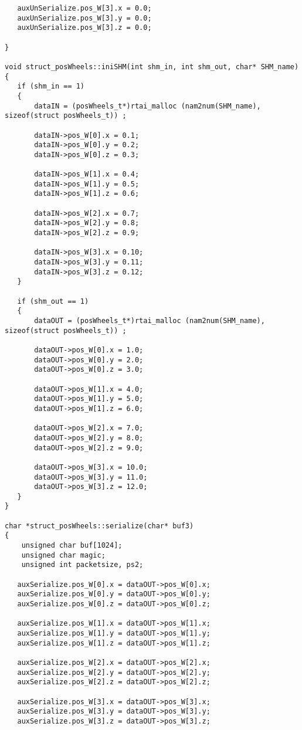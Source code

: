 \begin{verbatim}
   auxUnSerialize.pos_W[3].x = 0.0;
   auxUnSerialize.pos_W[3].y = 0.0;
   auxUnSerialize.pos_W[3].z = 0.0;

}

void struct_posWheels::iniSHM(int shm_in, int shm_out, char* SHM_name)
{
   if (shm_in == 1)
   {
       dataIN = (posWheels_t*)rtai_malloc (nam2num(SHM_name), sizeof(struct posWheels_t)) ;

       dataIN->pos_W[0].x = 0.1;
       dataIN->pos_W[0].y = 0.2;
       dataIN->pos_W[0].z = 0.3;

       dataIN->pos_W[1].x = 0.4;
       dataIN->pos_W[1].y = 0.5;
       dataIN->pos_W[1].z = 0.6;

       dataIN->pos_W[2].x = 0.7;
       dataIN->pos_W[2].y = 0.8;
       dataIN->pos_W[2].z = 0.9;

       dataIN->pos_W[3].x = 0.10;
       dataIN->pos_W[3].y = 0.11;
       dataIN->pos_W[3].z = 0.12;
   }

   if (shm_out == 1)
   {
       dataOUT = (posWheels_t*)rtai_malloc (nam2num(SHM_name), sizeof(struct posWheels_t)) ;

       dataOUT->pos_W[0].x = 1.0;
       dataOUT->pos_W[0].y = 2.0;
       dataOUT->pos_W[0].z = 3.0;

       dataOUT->pos_W[1].x = 4.0;
       dataOUT->pos_W[1].y = 5.0;
       dataOUT->pos_W[1].z = 6.0;

       dataOUT->pos_W[2].x = 7.0;
       dataOUT->pos_W[2].y = 8.0;
       dataOUT->pos_W[2].z = 9.0;

       dataOUT->pos_W[3].x = 10.0;
       dataOUT->pos_W[3].y = 11.0;
       dataOUT->pos_W[3].z = 12.0;
   }
}

char *struct_posWheels::serialize(char* buf3)
{
    unsigned char buf[1024];
    unsigned char magic;
    unsigned int packetsize, ps2;

   auxSerialize.pos_W[0].x = dataOUT->pos_W[0].x;
   auxSerialize.pos_W[0].y = dataOUT->pos_W[0].y;
   auxSerialize.pos_W[0].z = dataOUT->pos_W[0].z;

   auxSerialize.pos_W[1].x = dataOUT->pos_W[1].x;
   auxSerialize.pos_W[1].y = dataOUT->pos_W[1].y;
   auxSerialize.pos_W[1].z = dataOUT->pos_W[1].z;

   auxSerialize.pos_W[2].x = dataOUT->pos_W[2].x;
   auxSerialize.pos_W[2].y = dataOUT->pos_W[2].y;
   auxSerialize.pos_W[2].z = dataOUT->pos_W[2].z;

   auxSerialize.pos_W[3].x = dataOUT->pos_W[3].x;
   auxSerialize.pos_W[3].y = dataOUT->pos_W[3].y;
   auxSerialize.pos_W[3].z = dataOUT->pos_W[3].z;


\end{verbatim}
